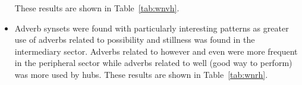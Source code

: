 \begin{itemize}
																																																																																																																																																																																																																																																																																																																																																																																															These results are shown in Table~\ref{tab:wnvh}.
																																																																																																																																																																																																																																																																																																																																																																																															\FloatBarrier
																																																																																																																																																																																																																																																																																																																																																																																																\item Adverb synsets were found with particularly interesting patterns as greater use of adverbs related to possibility and stillness was found in the intermediary sector.
																																																																																																																																																																																																																																																																																																																																																																																																		Adverbs related to however and even were more frequent in the peripheral sector while adverbs related to well (good way to perform) was more used by hubs.
																																																																																																																																																																																																																																																																																																																																																																																																				These results are shown in Table~\ref{tab:wnrh}.

\end{itemize}
